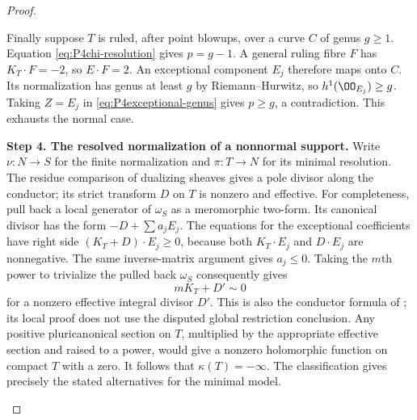 \begin{proof}
\begin{enumerate}[label={$\langle1\rangle$\arabic*.},leftmargin=*]
Finally suppose $T$ is ruled, after point blowups, over a curve
$C$ of genus $g\ge1$. Equation \eqref{eq:P4chi-resolution}
gives $p=g-1$. A general ruling fibre $F$ has $K_T\cdot F=-2$,
so $E\cdot F=2$. An exceptional component $E_j$ therefore
maps onto $C$. Its normalization has genus at least $g$ by
Riemann--Hurwitz, so $h^1(\OO_{E_j})\ge g$. Taking $Z=E_j$
in \eqref{eq:P4exceptional-genus} gives $p\ge g$, a contradiction.
This exhausts the normal case.

\noindent\textbf{Step 4. The resolved normalization of a nonnormal support.}
Write $\nu:N\to S$ for the finite normalization and $\pi:T\to N$
for its minimal resolution. The residue comparison of dualizing
sheaves gives a pole divisor along the conductor; its strict
transform $D$ on $T$ is nonzero and effective. For completeness,
pull back a local generator of $\omega_S$ as a meromorphic
two-form. Its canonical divisor has the form $-D+\sum a_jE_j$.
The equations for the exceptional coefficients have right side
$(K_T+D)\cdot E_j\ge0$, because both $K_T\cdot E_j$ and
$D\cdot E_j$ are nonnegative. The same inverse-matrix argument
gives $a_j\le0$. Taking the $m$th power to trivialize the pulled
back $\omega_S$ consequently gives
\[
 mK_T+D'\sim0
\]
for a nonzero effective integral divisor $D'$. This is also the
conductor formula of \cite[Lemma~4.6, p.~7 of the attached-source edition]{CDP20}; its local proof does
not use the disputed global restriction conclusion. Any
positive pluricanonical section on $T$, multiplied by the
appropriate effective section and raised to a power, would give
a nonzero holomorphic function on compact $T$ with a zero.
It follows that $\kappa(T)=-\infty$. The classification \cite[Chapter~VI, Theorem~1.1, p.~243]{BHPV2004E}
gives precisely the stated alternatives for the minimal model.

\end{enumerate}
\end{proof}